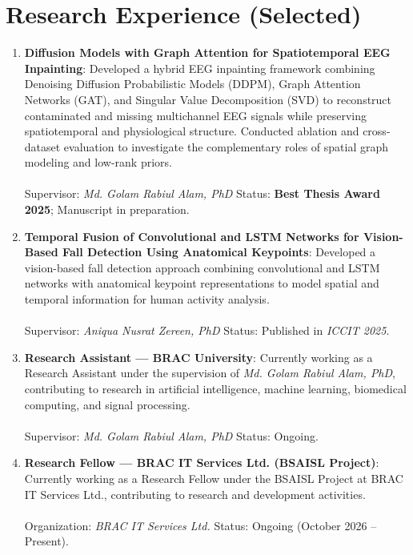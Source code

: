 \section{Research Experience (Selected)}

\begin{enumerate}

    \item \textbf{Diffusion Models with Graph Attention for Spatiotemporal EEG Inpainting}: Developed a hybrid EEG inpainting framework combining Denoising Diffusion Probabilistic Models (DDPM), Graph Attention Networks (GAT), and Singular Value Decomposition (SVD) to reconstruct contaminated and missing multichannel EEG signals while preserving spatiotemporal and physiological structure. Conducted ablation and cross-dataset evaluation to investigate the complementary roles of spatial graph modeling and low-rank priors.\\\\

    Supervisor: \textit{Md. Golam Rabiul Alam, PhD} \hfill Status: \textbf{Best Thesis Award 2025}; Manuscript in preparation.

    \item \textbf{Temporal Fusion of Convolutional and LSTM Networks for Vision-Based Fall Detection Using Anatomical Keypoints}: Developed a vision-based fall detection approach combining convolutional and LSTM networks with anatomical keypoint representations to model spatial and temporal information for human activity analysis.\\\\

    Supervisor: \textit{Aniqua Nusrat Zereen, PhD} \hfill Status: Published in \textit{ICCIT 2025}.

    \item \textbf{Research Assistant --- BRAC University}: Currently working as a Research Assistant under the supervision of \textit{Md. Golam Rabiul Alam, PhD}, contributing to research in artificial intelligence, machine learning, biomedical computing, and signal processing.\\\\

    Supervisor: \textit{Md. Golam Rabiul Alam, PhD} \hfill Status: Ongoing.

    \item \textbf{Research Fellow --- BRAC IT Services Ltd. (BSAISL Project)}: Currently working as a Research Fellow under the BSAISL Project at BRAC IT Services Ltd., contributing to research and development activities.\\\\

    Organization: \textit{BRAC IT Services Ltd.} \hfill Status: Ongoing (October 2026 -- Present).

\end{enumerate}

\endinput
